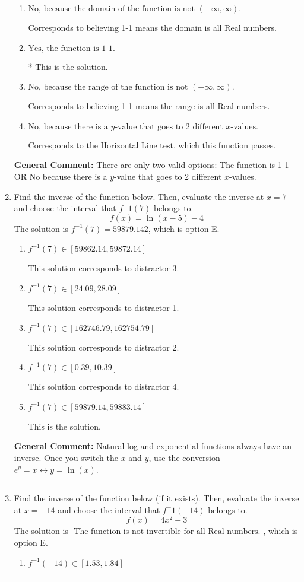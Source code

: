 \documentclass{extbook}[14pt]
\newcommand{\litem}[1]{\item #1

\rule{\textwidth}{0.4pt}}
\begin{document}
\begin{enumerate}
{\begin{enumerate}[label=\Alph*.]
Corresponds to the Vertical Line test, which checks if an expression is a function.
\item \( \text{No, because the domain of the function is not $(-\infty, \infty)$.} \)

Corresponds to believing 1-1 means the domain is all Real numbers.
\item \( \text{Yes, the function is 1-1.} \)

* This is the solution.
\item \( \text{No, because the range of the function is not $(-\infty, \infty)$.} \)

Corresponds to believing 1-1 means the range is all Real numbers.
\item \( \text{No, because there is a $y$-value that goes to 2 different $x$-values.} \)

Corresponds to the Horizontal Line test, which this function passes.
\end{enumerate}

\textbf{General Comment:} There are only two valid options: The function is 1-1 OR No because there is a $y$-value that goes to 2 different $x$-values.
}
\litem{
Find the inverse of the function below. Then, evaluate the inverse at $x = 7$ and choose the interval that $f^-1(7)$ belongs to.
\[ f(x) = \ln{(x-5)}-4 \]The solution is \( f^{-1}(7) = 59879.142 \), which is option E.\begin{enumerate}[label=\Alph*.]
\item \( f^{-1}(7) \in [59862.14, 59872.14] \)

 This solution corresponds to distractor 3.
\item \( f^{-1}(7) \in [24.09, 28.09] \)

 This solution corresponds to distractor 1.
\item \( f^{-1}(7) \in [162746.79, 162754.79] \)

 This solution corresponds to distractor 2.
\item \( f^{-1}(7) \in [0.39, 10.39] \)

 This solution corresponds to distractor 4.
\item \( f^{-1}(7) \in [59879.14, 59883.14] \)

 This is the solution.
\end{enumerate}

\textbf{General Comment:} Natural log and exponential functions always have an inverse. Once you switch the $x$ and $y$, use the conversion $ e^y = x \leftrightarrow y=\ln(x)$.
}
\litem{
Find the inverse of the function below (if it exists). Then, evaluate the inverse at $x = -14$ and choose the interval that $f^-1(-14)$ belongs to.
\[ f(x) = 4 x^2 + 3 \]The solution is \( \text{ The function is not invertible for all Real numbers. } \), which is option E.\begin{enumerate}[label=\Alph*.]
\item \( f^{-1}(-14) \in [1.53, 1.84] \)


\end{enumerate}}
\end{enumerate}
\end{document}
